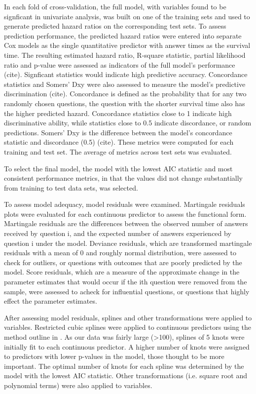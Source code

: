 \documentclass[12pt]{article}
\begin{document}
In each fold of cross-validation, the full model, with variables found to be signficant in univariate analysis, was built on one of the training sets and used to generate predicted hazard ratios on the corresponding test sets. To assess prediction performance, the predicted hazard ratios were entered into separate Cox models as the single quantitative predictor with answer times as the survival time. The resulting estimated hazard ratio, R-square statistic, partial likelihood ratio and p-value were assessed as indicators of the full model's performance (cite). Signficant statistics would indicate high predictive accuracy. Concordance statistics and Somers' Dxy were also assessed to measure the model's predictive discrimination (cite). Concordance is defined as the probability that for any two randomly chosen questions, the question with the shorter survival time also has the higher predicted hazard. Concordance statistics close to 1 indicate high discriminative ability, while statistics close to 0.5 indicate discordance, or random predictions. Somers' Dxy is the difference between the model's concordance statistic and discordance (0.5) (cite). These metrics were computed for each training and test set. The average of metrics across test sets was evaluated.

To select the final model, the model with the lowest AIC statistic and most consistent performance metrics, in that the values did not change substantially from training to test data sets, was selected.

To assess model adequacy, model residuals were examined. Martingale residuals plots were evaluated for each continuous predictor to assess the functional form. Martingale residuals are the differences between the observed number of answers received by question i, and the expected number of answers experienced by question i under the model. Deviance residuals, which are transformed martingale residuals with a mean of 0 and roughly normal distribution, were assessed to check for outliers, or questions with outcomes that are poorly predicted by the model. Score residuals, which are a measure of the approximate change in the parameter estimates that would occur if the ith question were removed from the sample, were assessed to acheck for influential questions, or questions that highly effect the parameter estimates. 

After assessing model residuals, splines and other transformations were applied to variables. Restricted cubic splines were applied to continuous predictors using the method outline in \cite{Harrell2015}. As our data was fairly large (>100), splines of 5 knots were initially fit to each continuous predictor. A higher number of knots were assigned to predictors with lower p-values in the model, those thought to be more important. The optimal number of knots for each spline was determined by the model with the lowest AIC statistic. Other transformations (i.e. square root and polynomial terms) were also applied to variables. 
\end{document}
